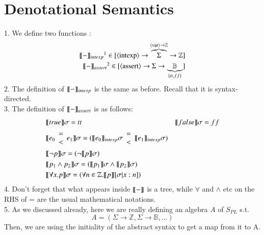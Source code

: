 \documentclass{report}[12pt]
\begin{document}
\section{Denotational Semantics}
1. We define two functions :
\begin{align*}
    \interp{ - }_{intexp}\footnotemark \in [\nonterminal{intexp} \rightarrow \overbrace{\Sigma}^{\nonterminal{var}\rightarrow \mathbb{Z}} \rightarrow \mathbb{Z}] \\
    \interp{ - }_{assert}\footnotemark \in [\nonterminal{assert} \rightarrow \Sigma \rightarrow \underbrace{\mathbb{B}}_{\{tt, ff\}}]
\end{align*}
2. The definition of $\llbracket  -  \rrbracket_{intexp}$ is the same as before. Recall that it is syntax-directed. \\
3. The definition of $\llbracket  -  \rrbracket_{assert}$ is as follows:
\begin{align*}
    &\llbracket  true  \rrbracket \sigma = tt &\llbracket  false  \rrbracket \sigma = ff \\
    &\llbracket  e_0 \begin{array}{c} = \\ < \end{array} e_1  \rrbracket \sigma = (\llbracket  e_0  \rrbracket_{intexp} \sigma \begin{array}{c} = \\ < \end{array} \llbracket  e_1  \rrbracket_{intexp} \sigma) \\
    &\llbracket  \neg p  \rrbracket \sigma = (\neg \llbracket  p  \rrbracket \sigma) \\
    &\llbracket  p_1 \wedge p_2  \rrbracket \sigma = (\llbracket  p_1  \rrbracket \sigma \wedge \llbracket  p_2  \rrbracket \sigma) \\
    &\llbracket  \forall x. p  \rrbracket \sigma = (\forall n \in \mathbb{Z}. \llbracket  p  \rrbracket [\sigma|x:n])
\end{align*}
4. Don't forget that what appears inside $\llbracket  -  \rrbracket$ is a tree, while $\forall$ and $\wedge$ etc on the RHS of = are the usual mathematical notations. \\
5. As we discussed already, here we are really defining an algebra $A$ of $S_{PL}$ s.t. \[A=(\Sigma \rightarrow \mathbb{Z}, \Sigma \rightarrow \mathbb{B}, \ldots)\]
Then, we are using the initiality of the abstract syntax to get a map from it to A.
\end{document}

